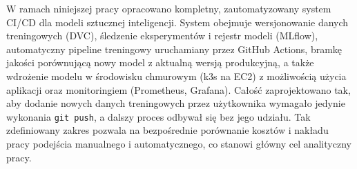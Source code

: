 W ramach niniejszej pracy opracowano kompletny, zautomatyzowany system CI/CD dla modeli sztucznej inteligencji. System obejmuje wersjonowanie danych treningowych (DVC), śledzenie eksperymentów i rejestr modeli (MLflow), automatyczny pipeline treningowy uruchamiany przez GitHub Actions, bramkę jakości porównującą nowy model z aktualną wersją produkcyjną, a także wdrożenie modelu w środowisku chmurowym (k3s na EC2) z możliwością użycia aplikacji oraz monitoringiem (Prometheus, Grafana). Całość zaprojektowano tak, aby dodanie nowych danych treningowych przez użytkownika wymagało jedynie wykonania \texttt{git push}, a dalszy proces odbywał się bez jego udziału. Tak zdefiniowany zakres pozwala na bezpośrednie porównanie kosztów i nakładu pracy podejścia manualnego i automatycznego, co stanowi główny cel analityczny pracy.
